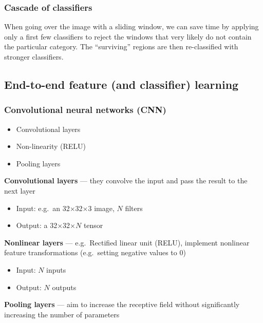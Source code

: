 \documentclass{article}
\begin{document}
        \subsubsection{Cascade of classifiers}
        When going over the image with a sliding window, we can save time by applying only a first few classifiers to reject the windows that very likely do not contain the particular category. The ``surviving'' regions are then re-classified with stronger classifiers.
    
        \subsection{End-to-end feature (and classifier) learning}
            \subsubsection{Convolutional neural networks (CNN)}

            \begin{itemize}
                \item Convolutional layers
                \item Non-linearity (RELU)
                \item Pooling layers
            \end{itemize}

            \textbf{Convolutional layers} --- they convolve the input and pass the result to the next layer
            
            \begin{itemize}
                \item Input: e.g.\ an 32$\times$32$\times$3 image, $N$ filters
                \item Output: a 32$\times$32$\times N$ tensor
            \end{itemize}

            \textbf{Nonlinear layers} --- e.g.\ Rectified linear unit (RELU), implement nonlinear feature transformations (e.g.\ setting negative values to 0)

            \begin{itemize}
                \item Input: $N$ inputs
                \item Output: $N$ outputs
            \end{itemize}

            \textbf{Pooling layers} --- aim to increase the receptive field without significantly increasing the number of parameters
\end{document}
